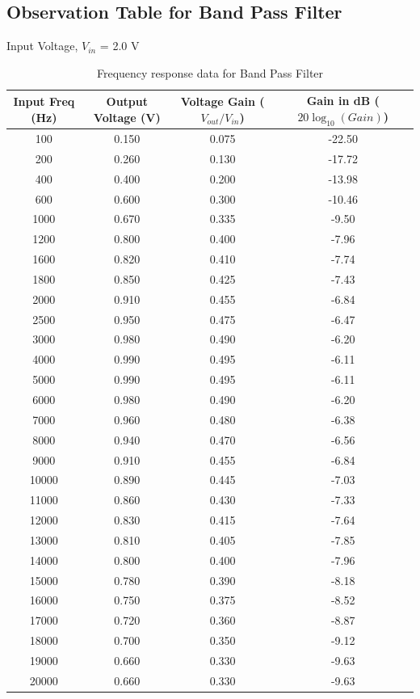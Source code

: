 \documentclass[12pt,a4paper]{article}
\begin{document}
\subsection{Observation Table for Band Pass Filter}
Input Voltage, $V_{in}$ = 2.0 V \\
\begin{table}[H]
\centering
\begin{tabular}{|c|c|c|c|}
\hline
\textbf{Input Freq (Hz)} & \textbf{Output Voltage (V)} & \textbf{Voltage Gain ($V_{out}/V_{in}$)} & \textbf{Gain in dB ($20\log_{10}(Gain)$)} \\
\hline
100 & 0.150 & 0.075 & -22.50 \\
200 & 0.260 & 0.130 & -17.72 \\
400 & 0.400 & 0.200 & -13.98 \\
600 & 0.600 & 0.300 & -10.46 \\
1000 & 0.670 & 0.335 & -9.50 \\
1200 & 0.800 & 0.400 & -7.96 \\
1600 & 0.820 & 0.410 & -7.74 \\
1800 & 0.850 & 0.425 & -7.43 \\
2000 & 0.910 & 0.455 & -6.84 \\
2500 & 0.950 & 0.475 & -6.47 \\
3000 & 0.980 & 0.490 & -6.20 \\
4000 & 0.990 & 0.495 & -6.11 \\
5000 & 0.990 & 0.495 & -6.11 \\
6000 & 0.980 & 0.490 & -6.20 \\
7000 & 0.960 & 0.480 & -6.38 \\
8000 & 0.940 & 0.470 & -6.56 \\
9000 & 0.910 & 0.455 & -6.84 \\
10000 & 0.890 & 0.445 & -7.03 \\
11000 & 0.860 & 0.430 & -7.33 \\
12000 & 0.830 & 0.415 & -7.64 \\
13000 & 0.810 & 0.405 & -7.85 \\
14000 & 0.800 & 0.400 & -7.96 \\
15000 & 0.780 & 0.390 & -8.18 \\
16000 & 0.750 & 0.375 & -8.52 \\
17000 & 0.720 & 0.360 & -8.87 \\
18000 & 0.700 & 0.350 & -9.12 \\
19000 & 0.660 & 0.330 & -9.63 \\
20000 & 0.660 & 0.330 & -9.63 \\
\hline
\end{tabular}
\caption{Frequency response data for Band Pass Filter}
\end{table}
\end{document}

